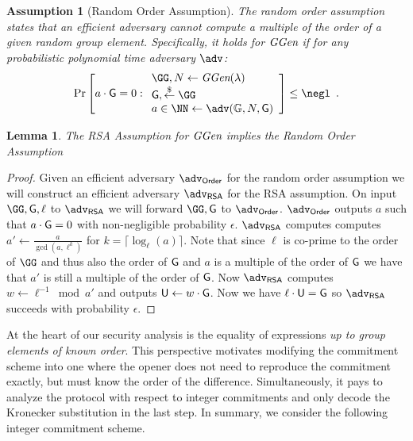 \documentclass[10pt,conference]{IEEEtran}
\theoremstyle{Definition}
\newtheorem{lemma}{Lemma}
\newtheorem{assumption}{Assumption}
\begin{document}
\begin{assumption}[Random Order Assumption]
	The random order assumption states that an efficient adversary cannot compute a multiple of the order of a given random group element. Specifically, it holds for $\textit{GGen}$ if for any probabilistic polynomial time adversary $\adv$:
	\[
    \Pr\left[a\cdot \Generator =0:
    \begin{array}{l}
         \GG, N \leftarrow \ggen(\lambda)  \\
         \Generator, \sample \GG\\
         a \in \NN \leftarrow \adv(\mathbb{G},N, \Generator) \\
    \end{array}\right] \leq \negl \enspace .
    \]
\end{assumption}
\begin{lemma}
\label{lem:roa-to-rsa}
	The RSA Assumption for $\textit{GGen}$ implies the Random Order Assumption
	\end{lemma}
\begin{proof}
	Given an efficient adversary $\adv_{\textsf{Order}}$ for the random order assumption we will construct an efficient adversary $\adv_{\textsf{RSA}}$ for the RSA assumption. On input $\GG,\Generator,\ell$ to $\adv_{\textsf{RSA}}$ we will forward $\GG,\Generator$ to $\adv_{\textsf{Order}}$. $\adv_{\textsf{Order}}$ outputs $a$ such that $a\cdot \mathsf{G}=0$ with non-negligible probability $\epsilon$. 
	$\adv_{\textsf{RSA}}$ computes computes $a'\gets \frac{a}{\gcd(a,\ell^k)}$ for $k=\lceil\log_\ell(a)\rceil$. Note that since $\ell$ is co-prime to the order of $\GG$ and thus also the order of $\mathsf{G}$ and $a$ is a multiple of the order of $\mathsf{G}$ we have that $a'$ is still a multiple of the order of $\mathsf{G}$. Now $\adv_{\textsf{RSA}}$ computes $w\gets \ell^{-1} \bmod a'$ and outputs $\mathsf{U} \gets w\cdot \mathsf{G}$. Now we have $\ell \cdot \mathsf{U}=\mathsf{G}$ so $\adv_{\textsf{RSA}}$ succeeds with probability $\epsilon$.
\end{proof}

At the heart of our security analysis is the equality of expressions \emph{up to group elements of known order}. This perspective motivates modifying the commitment scheme into one where the opener does not need to reproduce the commitment exactly, but must know the order of the difference. Simultaneously, it pays to analyze the protocol with respect to integer commitments and only decode the Kronecker substitution in the last step. In summary, we consider the following integer commitment scheme.
\end{document}
